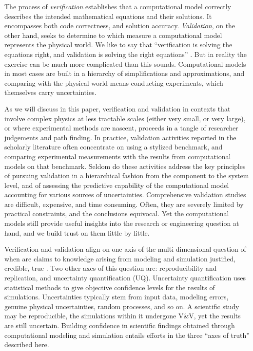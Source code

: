 The process of \emph{verification} establishes that a computational model correctly describes the intended mathematical equations and their solutions.
It encompasses both code correctness, and solution accuracy.
\emph{Validation}, on the other hand, seeks to determine to which measure a computational model represents the physical world. 
We like to say that ``verification is solving the equations right, and validation is solving the right equations'' \cite{roache1998}. 
But in reality the exercise can be much more complicated than this sounds. 
Computational models in most cases are built in a hierarchy of simplifications and approximations, and comparing with the physical world means conducting experiments, which themselves carry uncertainties. 

As we will discuss in this paper, verification and validation in contexts that involve complex physics at less tractable scales (either very small, or very large), or where experimental methods are nascent, proceeds in a tangle of researcher judgements and path finding. 
In practice, validation activities reported in the scholarly literature often concentrate on using a stylized benchmark, and comparing experimental measurements with the results from computational models on that benchmark. 
Seldom do these activities address the key principles of pursuing validation in a hierarchical fashion from the component to the system level, and of assessing the predictive capability of the computational model accounting for various sources of uncertainties. 
Comprehensive validation studies are difficult, expensive, and time consuming. 
Often, they are severely limited by practical constraints, and the conclusions equivocal. 
Yet the computational models still provide useful insights into the research or engineering question at hand, and we build trust on them little by little.

Verification and validation align on one axis of the multi-dimensional question of when are claims to knowledge arising from modeling and simulation justified, credible, true \cite{winsberg-2010}.
Two other axes of this question are: reproducibility and replication, and uncertainty quantification (UQ).
Uncertainty quantification uses statistical methods to give objective confidence levels for the results of simulations. 
Uncertainties typically stem from input data, modeling errors, genuine physical uncertainties, random processes, and so on. 
A scientific study may be reproducible, the simulations within it undergone V\&V, yet the results are still uncertain. 
Building confidence in scientific findings obtained through computational modeling and simulation entails efforts in the three ``axes of truth'' described here.

